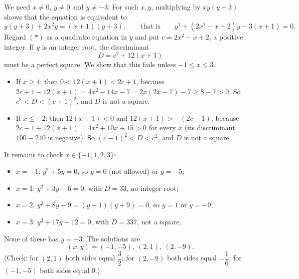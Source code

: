 We need $x\ne0$, $y\ne0$ and $y\ne-3$. For such $x,y$, multiplying by $xy(y+3)$ shows that the equation is equivalent to
\[y(y+3)+2x^2y=(x+1)(y+3),\qquad\text{that is}\qquad y^2+\left(2x^2-x+2\right)y-3(x+1)=0.\tag{$*$}\]
Regard $(*)$ as a quadratic equation in $y$ and put $c=2x^2-x+2$, a positive integer. If $y$ is an integer root, the discriminant
\[D=c^2+12(x+1)\]
must be a perfect square. We show that this fails unless $-1\le x\le3$.
\begin{itemize}
\item If $x\ge4$: then $0<12(x+1)<2c+1$, because $2c+1-12(x+1)=4x^2-14x-7=2x(2x-7)-7\ge8-7>0$. So $c^2<D<(c+1)^2$, and $D$ is not a square.
\item If $x\le-2$: then $12(x+1)<0$ and $12(x+1)>-(2c-1)$, because $2c-1+12(x+1)=4x^2+10x+15>0$ for every $x$ (its discriminant $100-240$ is negative). So $(c-1)^2<D<c^2$, and $D$ is not a square.
\end{itemize}
It remains to check $x\in\{-1,1,2,3\}$:
\begin{itemize}
\item $x=-1$: $y^2+5y=0$, so $y=0$ (not allowed) or $y=-5$;
\item $x=1$: $y^2+3y-6=0$, with $D=33$, no integer root;
\item $x=2$: $y^2+8y-9=(y-1)(y+9)=0$, so $y=1$ or $y=-9$;
\item $x=3$: $y^2+17y-12=0$, with $D=337$, not a square.
\end{itemize}
None of these has $y=-3$. The solutions are
\[\boxed{(x,y)=(-1,-5),\ (2,1),\ (2,-9)}.\]
(Check: for $(2,1)$ both sides equal $\dfrac32$; for $(2,-9)$ both sides equal $-\dfrac16$; for $(-1,-5)$ both sides equal $0$.)
